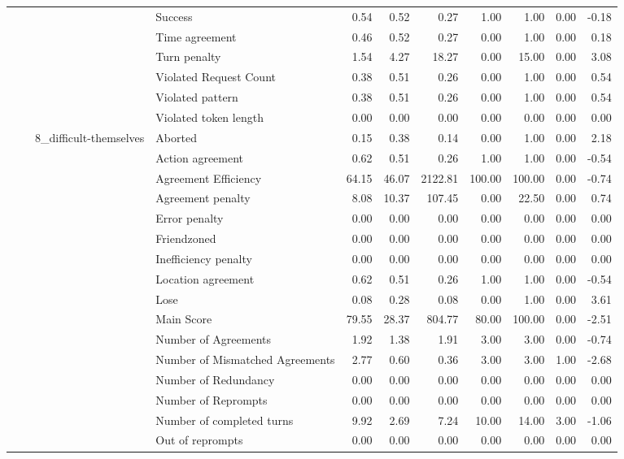 \begin{tabular}{llllrrrrrrr}
 &  &  & Success & 0.54 & 0.52 & 0.27 & 1.00 & 1.00 & 0.00 & -0.18 \\
 &  &  & Time agreement & 0.46 & 0.52 & 0.27 & 0.00 & 1.00 & 0.00 & 0.18 \\
 &  &  & Turn penalty & 1.54 & 4.27 & 18.27 & 0.00 & 15.00 & 0.00 & 3.08 \\
 &  &  & Violated Request Count & 0.38 & 0.51 & 0.26 & 0.00 & 1.00 & 0.00 & 0.54 \\
 &  &  & Violated pattern & 0.38 & 0.51 & 0.26 & 0.00 & 1.00 & 0.00 & 0.54 \\
 &  &  & Violated token length & 0.00 & 0.00 & 0.00 & 0.00 & 0.00 & 0.00 & 0.00 \\
\cline{3-11}
 &  & \multirow[t]{27}{*}{8_difficult-themselves} & Aborted & 0.15 & 0.38 & 0.14 & 0.00 & 1.00 & 0.00 & 2.18 \\
 &  &  & Action agreement & 0.62 & 0.51 & 0.26 & 1.00 & 1.00 & 0.00 & -0.54 \\
 &  &  & Agreement Efficiency & 64.15 & 46.07 & 2122.81 & 100.00 & 100.00 & 0.00 & -0.74 \\
 &  &  & Agreement penalty & 8.08 & 10.37 & 107.45 & 0.00 & 22.50 & 0.00 & 0.74 \\
 &  &  & Error penalty & 0.00 & 0.00 & 0.00 & 0.00 & 0.00 & 0.00 & 0.00 \\
 &  &  & Friendzoned & 0.00 & 0.00 & 0.00 & 0.00 & 0.00 & 0.00 & 0.00 \\
 &  &  & Inefficiency penalty & 0.00 & 0.00 & 0.00 & 0.00 & 0.00 & 0.00 & 0.00 \\
 &  &  & Location agreement & 0.62 & 0.51 & 0.26 & 1.00 & 1.00 & 0.00 & -0.54 \\
 &  &  & Lose & 0.08 & 0.28 & 0.08 & 0.00 & 1.00 & 0.00 & 3.61 \\
 &  &  & Main Score & 79.55 & 28.37 & 804.77 & 80.00 & 100.00 & 0.00 & -2.51 \\
 &  &  & Number of Agreements & 1.92 & 1.38 & 1.91 & 3.00 & 3.00 & 0.00 & -0.74 \\
 &  &  & Number of Mismatched Agreements & 2.77 & 0.60 & 0.36 & 3.00 & 3.00 & 1.00 & -2.68 \\
 &  &  & Number of Redundancy & 0.00 & 0.00 & 0.00 & 0.00 & 0.00 & 0.00 & 0.00 \\
 &  &  & Number of Reprompts & 0.00 & 0.00 & 0.00 & 0.00 & 0.00 & 0.00 & 0.00 \\
 &  &  & Number of completed turns & 9.92 & 2.69 & 7.24 & 10.00 & 14.00 & 3.00 & -1.06 \\
 &  &  & Out of reprompts & 0.00 & 0.00 & 0.00 & 0.00 & 0.00 & 0.00 & 0.00 \\

\end{tabular}

